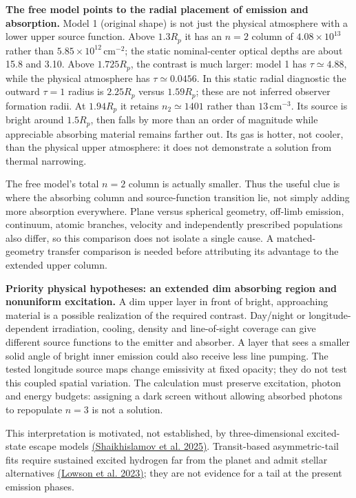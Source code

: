 \documentclass[10pt,a4paper]{article}
\begin{document}
\textbf{The free model points to the radial placement of emission and absorption.}
Model 1 (original shape) is not just the physical atmosphere with a lower upper source
function. Above $1.3R_p$ it has an $n=2$ column of
$4.08\times10^{13}$ rather than $5.85\times10^{12}\,\mathrm{cm}^{-2}$;
the static nominal-center optical depths are about 15.8 and 3.10.
Above $1.725R_p$, the contrast is much larger: model 1 has
$\tau\simeq4.88$, while the physical atmosphere has $\tau\simeq0.0456$.
In this static radial diagnostic the outward $\tau=1$ radius is
$2.25R_p$ versus $1.59R_p$; these are not inferred observer formation radii.
At $1.94R_p$ it retains $n_2\simeq1401$ rather than
$13\,\mathrm{cm}^{-3}$. Its source is bright around $1.5R_p$, then falls
by more than an order of magnitude while appreciable absorbing material
remains farther out. Its gas is hotter, not cooler, than the physical
upper atmosphere: it does not demonstrate a solution from thermal narrowing.

The free model's total $n=2$ column is actually smaller. Thus the useful
clue is where the absorbing column and source-function transition lie,
not simply adding more absorption everywhere. Plane versus spherical
geometry, off-limb emission, continuum, atomic branches, velocity and
independently prescribed populations also differ, so this comparison
does not isolate a single cause. A matched-geometry transfer comparison
is needed before attributing its advantage to the extended upper column.

\textbf{Priority physical hypotheses: an extended dim absorbing region and nonuniform excitation.}
A dim upper layer in front of bright, approaching material is a possible
realization of the required contrast. Day/night or longitude-dependent
irradiation, cooling, density and line-of-sight coverage can give different
source functions to the emitter and absorber. A layer that sees a smaller
solid angle of bright inner emission could also receive less line pumping.
The tested longitude source maps change emissivity at fixed opacity;
they do not test this coupled spatial variation. The calculation must
preserve excitation, photon and energy budgets: assigning a dark screen
without allowing absorbed photons to repopulate $n=3$ is not a solution.

This interpretation is motivated, not established, by three-dimensional
excited-state escape models
\href{https://doi.org/10.1051/0004-6361/202453309}{(Shaikhislamov et al. 2025)}.
Transit-based asymmetric-tail fits require sustained excited hydrogen far
from the planet and admit stellar alternatives
\href{https://arxiv.org/abs/2301.10406}{(Lowson et al. 2023)}; they are not
evidence for a tail at the present emission phases.
\end{document}
